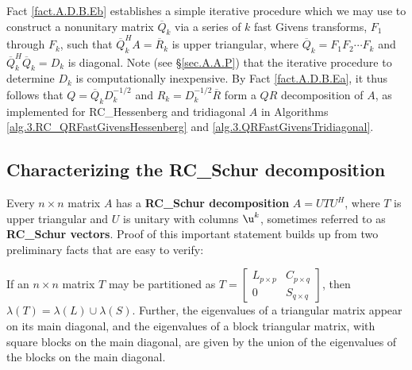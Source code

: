 \begin{figure*}[t]

\end{figure*}

\noindent 
Fact \ref{fact.A.D.B.Eb} establishes a simple iterative procedure which we may use
to construct a nonunitary matrix $\overline Q_k$ via a series of $k$ fast Givens transforms, $F_1$ through $F_k$, such that
$\overline Q_k^H A= \overline R_k$ is upper triangular, where $\overline Q_k=F_1 F_2 \cdots F_k$ and $\overline Q_k^H \overline Q_k= D_k$ is diagonal. 
Note (see \S \ref{sec.A.A.P}) that the iterative procedure to determine $D_{k}$ is computationally inexpensive. 
By Fact \ref{fact.A.D.B.Ea}, it thus follows that $Q=\overline Q_k D_k^{-1/2}$ and $R_k=D_k^{-1/2} \overline R$ form a $QR$ decomposition of $A$,
as implemented for RC_Hessenberg and tridiagonal $A$ in
Algorithms \ref{alg.3.RC_QRFastGivensHessenberg} and \ref{alg.3.QRFastGivensTridiagonal}.

\subsection{Characterizing the RC_Schur decomposition}\label{sec.A.D.C}

Every $n\times n$ matrix $A$ has a {\bf RC_Schur decomposition} $A=U T U^{H}$,
where $T$ is upper triangular and $U$ is unitary with columns $\u^k$, sometimes referred to as
{\bf RC_Schur vectors}.  Proof of this
important statement builds up from two preliminary facts that are easy
to verify:\medskip

\begin{fact} \label{fact.A.D.C.A}
If an $n\times n$ matrix $T$ may be partitioned
as $T=\begin{bmatrix} L_{p\times p} & C_{p\times q} \\ 0 & S_{q \times q} \end{bmatrix}$, then $\lambda(T)=\lambda(L) \cup \lambda(S)$.
Further, the eigenvalues of a triangular matrix appear on its main diagonal,
and the eigenvalues of a block triangular matrix, with square blocks on the main diagonal, are given by the union of the eigenvalues of the blocks
on the main diagonal.
\end{fact}

